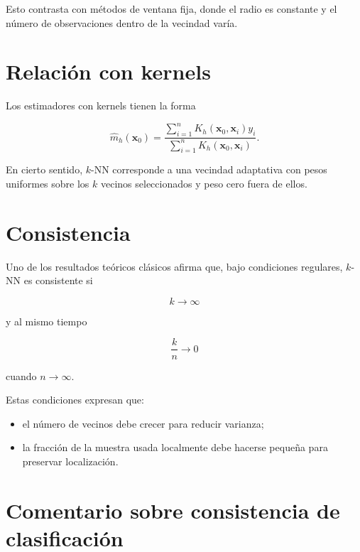 \documentclass[
  spanish,
  10.5pt,
  letterpaper,
  DIV=11,
  numbers=noendperiod,
  oneside,
  open=any]{scrreprt}
\providecommand{\tightlist}{%
  \setlength{\itemsep}{0pt}\setlength{\parskip}{0pt}}
\theoremstyle{definition}
\theoremstyle{definition}
\theoremstyle{plain}
\theoremstyle{remark}
\begin{document}
Esto contrasta con métodos de ventana fija, donde el radio es constante
y el número de observaciones dentro de la vecindad varía.

\section*{Relación con kernels}\label{relaciuxf3n-con-kernels}


Los estimadores con kernels tienen la forma

\[
\widehat{m}_h(\mathbf{x}_0)
=
\frac{
\sum_{i=1}^{n} K_h(\mathbf{x}_0,\mathbf{x}_i) y_i
}{
\sum_{i=1}^{n} K_h(\mathbf{x}_0,\mathbf{x}_i)
}.
\]

En cierto sentido, \(k\)-NN corresponde a una vecindad adaptativa con
pesos uniformes sobre los \(k\) vecinos seleccionados y peso cero fuera
de ellos.

\section*{Consistencia}\label{consistencia-1}


Uno de los resultados teóricos clásicos afirma que, bajo condiciones
regulares, \(k\)-NN es consistente si

\[
k\to\infty
\]

y al mismo tiempo

\[
\frac{k}{n}\to 0
\]

cuando \(n\to\infty\).

Estas condiciones expresan que:

\begin{itemize}
\tightlist
\item
  el número de vecinos debe crecer para reducir varianza;
\item
  la fracción de la muestra usada localmente debe hacerse pequeña para
  preservar localización.
\end{itemize}

\section*{Comentario sobre consistencia de
clasificación}\label{comentario-sobre-consistencia-de-clasificaciuxf3n}
\end{document}
